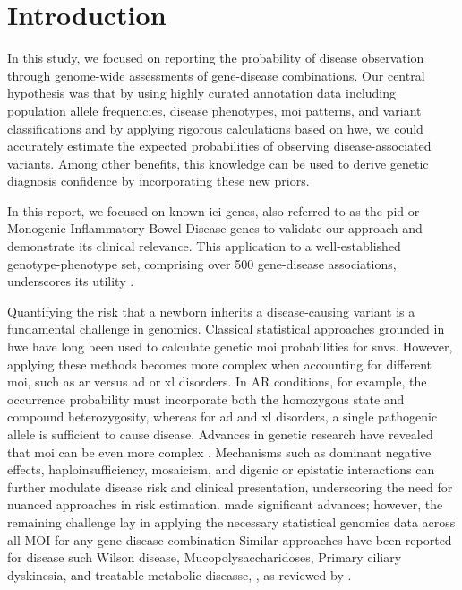 \section{Introduction}

In this study, we focused on reporting the probability of disease observation through genome-wide assessments of gene-disease combinations. Our central hypothesis was that by using highly curated annotation data including population allele frequencies, disease phenotypes, \ac{moi} patterns, and variant classifications and by applying rigorous calculations based on \ac{hwe}, we could accurately estimate the expected probabilities of observing disease-associated variants.
Among other benefits, this knowledge can be used to derive genetic diagnosis confidence by incorporating these new priors.

In this report, we focused on known \ac{iei} genes, also referred to as the \ac{pid} or Monogenic Inflammatory Bowel Disease genes \cite{tangye_human_2022, lawless_panelapprex_2025, martin_panelapp_2019} 
to validate our approach and demonstrate its clinical relevance. This application to a well-established genotype-phenotype set, comprising over 500 gene-disease associations, underscores its utility \cite{tangye_human_2022}.

Quantifying the risk that a newborn inherits a disease-causing variant is a fundamental challenge in genomics. Classical statistical approaches grounded in \ac{hwe} \cite{MayoCentury2008, AbramovsHardyWeinberg2020} have long been used to calculate genetic \ac{moi} probabilities for \ac{snv}s. However, applying these methods becomes more complex when accounting for different \ac{moi}, such as \ac{ar} versus \ac{ad} or \ac{xl} disorders. In AR conditions, for example, the occurrence probability must incorporate both the homozygous state and compound heterozygosity, whereas for \ac{ad} and \ac{xl} disorders, a single pathogenic allele is sufficient to cause disease. 
Advances in genetic research have revealed that \ac{moi} can be even more complex \cite{zschocke_mendelian_2023}. Mechanisms such as dominant negative effects, haploinsufficiency, mosaicism, and digenic or epistatic interactions can further modulate disease risk and clinical presentation, underscoring the need for nuanced approaches in risk estimation.
\citet{karczewski2020mutational} made significant advances; however, the remaining challenge lay in applying the necessary statistical genomics data across all MOI for any gene-disease combination 
Similar approaches have been reported for disease such Wilson disease, Mucopolysaccharidoses,  Primary ciliary dyskinesia, and treatable metabolic diseasse, 
\cite{bick_estimating_2025, evans_estimating_2021}, 
as reviewed by \citet{hannah_using_2024}.

